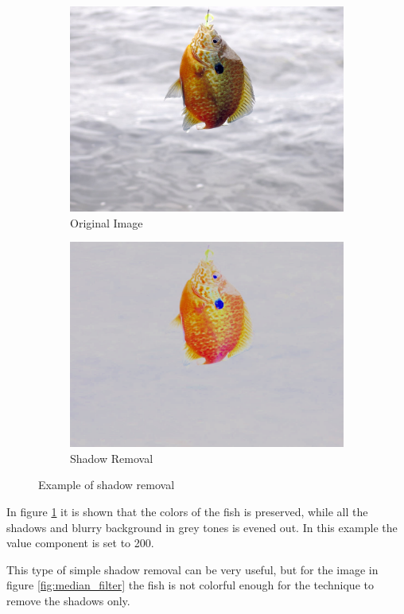 \begin{figure}[h]
    \centering
    \begin{subfigure}{0.5\textwidth}
        \centering
        \includegraphics[width=.9\linewidth]{Images/colorfish}
        \caption{Original Image}
    \end{subfigure}%
    \begin{subfigure}{.5\textwidth}
        \centering
        \includegraphics[width=.9\linewidth]{Images/shadow_removal}
        \caption{Shadow Removal}
    \end{subfigure}
    \caption{Example of shadow removal}
    \label{fig:shadow_removal}
\end{figure}

In figure \ref{fig:shadow_removal} it is shown that the colors of the fish is preserved, while all the shadows and blurry background in grey tones is evened out. In this example the value component is set to 200.

This type of simple shadow removal can be very useful, but for the image in figure \ref{fig:median_filter} the fish is not colorful enough for the technique to remove the shadows only.

